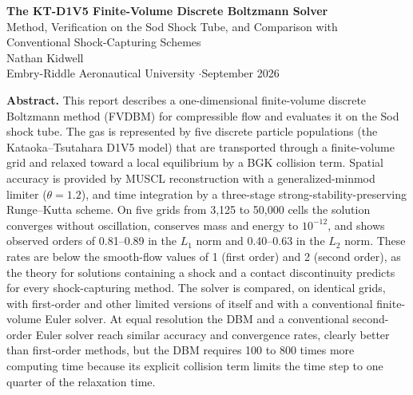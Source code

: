 \documentclass[11pt]{article}
\begin{document}
\begin{center}
{\Large\bfseries The KT-D1V5 Finite-Volume Discrete Boltzmann Solver}\\[6pt]
{\large Method, Verification on the Sod Shock Tube, and Comparison with\\ Conventional Shock-Capturing Schemes}\\[14pt]
{\normalsize Nathan Kidwell}\\[2pt]
{\small Embry-Riddle Aeronautical University \quad$\cdot$\quad September 2026}
\end{center}

\vspace{4pt}
\begin{tcolorbox}[colback=white,colframe=black!60,boxrule=0.5pt,arc=0pt,left=8pt,right=8pt]
\small\textbf{Abstract.}\;
This report describes a one-dimensional finite-volume discrete Boltzmann method (FVDBM)
for compressible flow and evaluates it on the Sod shock tube.  The gas is represented by
five discrete particle populations (the Kataoka--Tsutahara D1V5 model) that are transported
through a finite-volume grid and relaxed toward a local equilibrium by a BGK collision term.
Spatial accuracy is provided by MUSCL reconstruction with a generalized-minmod limiter
($\theta = 1.2$), and time integration by a three-stage strong-stability-preserving
Runge--Kutta scheme.  On five grids from 3{,}125 to 50{,}000 cells the solution converges
without oscillation, conserves mass and energy to $10^{-12}$, and shows observed orders of
0.81--0.89 in the $L_1$ norm and 0.40--0.63 in the $L_2$ norm.  These rates are below the
smooth-flow values of 1 (first order) and 2 (second order), as the theory for solutions
containing a shock and a contact discontinuity predicts for every shock-capturing method.
The solver is compared, on identical grids, with first-order and other limited versions of
itself and with a conventional finite-volume Euler solver.  At equal resolution the
DBM and a conventional second-order Euler solver reach similar accuracy and convergence
rates, clearly better than first-order methods, but the DBM requires 100 to 800 times more
computing time because its explicit collision term limits the time step to one quarter of
the relaxation time.
\end{tcolorbox}

\vspace{2pt}
{\small\tableofcontents}
\clearpage

\end{document}
